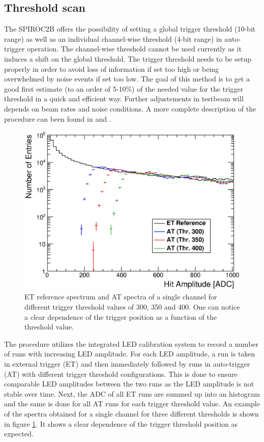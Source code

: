 \subsection{Threshold scan}

The SPIROC2B offers the possibility of setting a global trigger threshold (10-bit range) as well as an individual channel-wise threshold (4-bit range) in auto-trigger operation. The channel-wise threshold cannot be used currently as it induces a shift on the global threshold. The trigger threshold needs to be setup properly in order to avoid loss of information if set too high or being overwhelmed by noise events if set too low. The goal of this method is to get a good first estimate (to an order of 5-10\%) of the needed value for the trigger threshold in a quick and efficient way. Further adjustements in testbeam will depends on beam rates and noise conditions. A more complete description of the procedure can been found in \cite{Hartbrich:2016bbz} and \cite{LloydTrigger}.

\begin{figure}[htbp!]
  \centering
  \includegraphics[width=0.6\linewidth]{../Thesis_Plots/Commissioning/Plots/SpectraADC_HBU2_12.eps}
  \caption{ET reference spectrum and AT spectra of a single channel for different trigger threshold values of 300, 350 and 400. One can notice a clear dependence of the trigger position as a function of the threshold value.} \label{fig:ADCTriggerThreshold}
\end{figure}

The procedure utilizes the integrated LED calibration system to record a number of runs with increasing LED amplitude. For each LED amplitude, a run is taken in external trigger (ET) and then immediately followed by runs in auto-trigger (AT) with different trigger threshold configurations. This is done to ensure comparable LED amplitudes between the two runs as the LED amplitude is not stable over time. Next, the ADC of all ET runs are summed up into an histogram and the same is done for all AT runs for each trigger threshold value. An example of the spectra obtained for a single channel for three different thresholds is shown in figure \ref{fig:ADCTriggerThreshold}. It shows a clear dependence of the trigger threshold position as expected.

